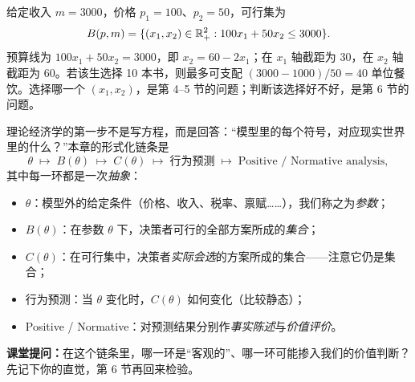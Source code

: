 \begin{example}[预算约束的形式化]
给定收入 $m=3000$，价格 $p_1=100$、$p_2=50$，可行集为
\[
B(p,m)=\{(x_1,x_2)\in\mathbb{R}_+^2:100x_1+50x_2\le 3000\}.
\]
预算线为 $100x_1+50x_2=3000$，即 $x_2=60-2x_1$；在 $x_1$ 轴截距为 30，在 $x_2$ 轴截距为 60。若该生选择 10 本书，则最多可支配 $(3000-1000)/50=40$ 单位餐饮。选择哪一个 $(x_1,x_2)$，是第 4--5 节的问题；判断该选择好不好，是第 6 节的问题。
\end{example}


理论经济学的第一步不是写方程，而是回答：“模型里的每个符号，对应现实世界里的什么？”本章的形式化链条是
\[
\theta \;\longmapsto\; B(\theta) \;\longmapsto\; C(\theta)
\;\longmapsto\; \text{行为预测} \;\longmapsto\; \text{Positive / Normative analysis},
\]
其中每一环都是一次\emph{抽象}：
\begin{itemize}
  \item $\theta$：模型外的给定条件（价格、收入、税率、禀赋……），我们称之为\emph{参数}；
  \item $B(\theta)$：在参数 $\theta$ 下，决策者可行的全部方案所成的\emph{集合}；
  \item $C(\theta)$：在可行集中，决策者\emph{实际会选}的方案所成的集合——注意它仍是集合；
  \item 行为预测：当 $\theta$ 变化时，$C(\theta)$ 如何变化（比较静态）；
  \item Positive / Normative：对预测结果分别作\emph{事实陈述}与\emph{价值评价}。
\end{itemize}

\medskip
\noindent\textbf{课堂提问：}在这个链条里，哪一环是“客观的”、哪一环可能掺入我们的价值判断？先记下你的直觉，第 6 节再回来检验。
